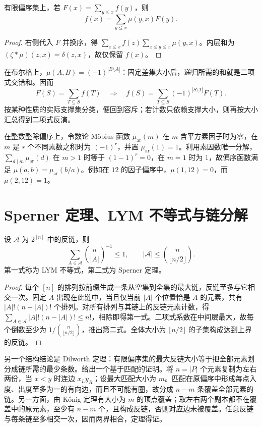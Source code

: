 \documentclass[UTF8,12pt,a4paper,fontset=fandol]{ctexbook}
\begin{document}
\begin{theorem}[M\"obius 反演]
有限偏序集上，若 $F(x)=\sum_{y\le x}f(y)$，则
\[
 f(x)=\sum_{y\le x}\mu(y,x)F(y).
\]
\end{theorem}
\begin{proof}
右侧代入 $F$ 并换序，得 $\sum_{z\le x}f(z)\sum_{z\le y\le x}\mu(y,x)$。内层和为 $(\zeta*\mu)(z,x)=\delta(z,x)$，故仅保留 $f(x)$。
\end{proof}

在布尔格上，$\mu(A,B)=(-1)^{|B\setminus A|}$：固定差集大小后，递归所需的和就是二项式交错和。因而
\[
 F(S)=\sum_{T\subseteq S}f(T)
 \quad\Longrightarrow\quad
 f(S)=\sum_{T\subseteq S}(-1)^{|S\setminus T|}F(T).
\]
按某种性质的实际支撑集分类，便回到容斥；若计数只依赖支撑大小，则再按大小汇总得到二项式反演。

在整数整除偏序上，令数论 M\"obius 函数 $\mu_{\mathrm{ar}}(m)$ 在 $m$ 含平方素因子时为零，在 $m$ 是 $r$ 个不同素数之积时为 $(-1)^r$，并置 $\mu_{\mathrm{ar}}(1)=1$。利用素因数唯一分解，$\sum_{d\mid m}\mu_{\mathrm{ar}}(d)$ 在 $m>1$ 时等于 $(1-1)^r=0$，在 $m=1$ 时为 $1$，故偏序函数满足 $\mu(a,b)=\mu_{\mathrm{ar}}(b/a)$。例如在 $12$ 的因子偏序中，$\mu(1,12)=0$，而 $\mu(2,12)=1$。

\section{Sperner 定理、LYM 不等式与链分解}

\begin{theorem}
设 $\mathcal A$ 为 $2^{[n]}$ 中的反链，则
\begin{equation}
 \sum_{A\in\mathcal A}\binom n{|A|}^{-1}\le1,
 \qquad |\mathcal A|\le\binom n{\lfloor n/2\rfloor}.
 \label{eq:sperner}
\end{equation}
第一式称为 LYM 不等式，第二式为 Sperner 定理。
\end{theorem}
\begin{proof}
每个 $[n]$ 的排列按前缀生成一条从空集到全集的最大链，反链至多与它相交一次。固定 $A$ 出现在此链中，当且仅当前 $|A|$ 个位置恰是 $A$ 的元素，共有 $|A|!(n-|A|)!$ 个排列。对所有排列与其链上的反链元素计数，得 $\sum_{A\in\mathcal A}|A|!(n-|A|)!\le n!$，相除即得第一式。二项式系数在中间层最大，故每个倒数至少为 $1/\binom n{\lfloor n/2\rfloor}$，推出第二式。全体大小为 $\lfloor n/2\rfloor$ 的子集构成达到上界的反链。
\end{proof}

另一个结构结论是 Dilworth 定理：有限偏序集的最大反链大小等于把全部元素划分成链所需的最少条数。给出一个基于匹配的证明。将 $n=|P|$ 个元素复制为左右两份，当 $x<y$ 时连边 $x_Ly_R$；设最大匹配大小为 $m$。匹配在原偏序中形成每点入度、出度至多为一的有向边，而且不可能有圈，故分成 $n-m$ 条覆盖全部元素的链。另一方面，由 K\H{o}nig 定理有大小为 $m$ 的顶点覆盖；取左右两个副本都不在覆盖中的原元素，至少有 $n-m$ 个，且构成反链，否则对应边未被覆盖。任意反链与每条链至多相交一次，因而两界相合，定理得证。
\end{document}
